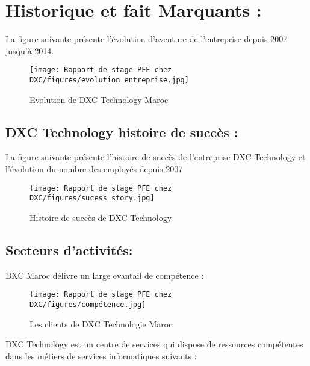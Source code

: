 \newpage

\section{Historique et fait Marquants :}

La figure suivante présente l’évolution d’aventure de l’entreprise depuis 2007 jusqu’à 2014.

\begin{figure}[!h]
    \centering
    \texttt{[image: Rapport de stage PFE chez DXC/figures/evolution\_entreprise.jpg]}
    \caption{Evolution de DXC Technology Maroc}
\end{figure}

\newpage
\subsection{DXC Technology histoire de succès :}

La figure suivante présente l’histoire de succès de l’entreprise DXC Technology et l’évolution du nombre des employés depuis 2007

\begin{figure}[!h]
    \centering
    \texttt{[image: Rapport de stage PFE chez DXC/figures/sucess\_story.jpg]}
    \caption{Histoire de succès de DXC Technology}
\end{figure}

\subsection{Secteurs d’activités:}

DXC Maroc délivre un large evantail de compétence :

\begin{figure}[!h]
    \centering
    \texttt{[image: Rapport de stage PFE chez DXC/figures/compétence.jpg]}
    \caption{Les clients de DXC Technologie Maroc}
\end{figure}

\newpage
DXC Technology est un centre de services qui dispose de ressources compétentes dans les
métiers de services informatiques suivants :

